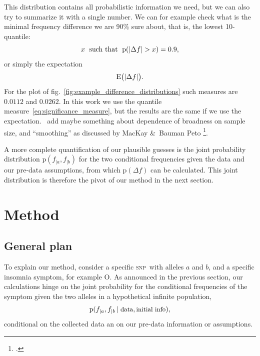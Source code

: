\documentclass[\ifafour a4paper,12pt,\else a5paper,10pt,\fi%
onecolumn,oneside,article,%
british%
]{memoir}
\theoremstyle{remark}
\theoremstyle{innote}
\newcommand*{\citey}{\footcites}
\newcommand*{\amp}{\&}
\newcommand*{\pu}{\piup}%
\DeclarePairedDelimiter\abs{\lvert}{\rvert}
\newcommand*{\pf}{\mathrm{p}}%
\newcommand*{\E}{\mathrm{E}}
\renewcommand*{\|}[1][]{\nonscript\,#1\vert\nonscript\;\mathopen{}}
\newcommand*{\sect}{\S}%
\newcommand*{\fig}{fig.}%
\newcommand*{\puzzle}{{\fontencoding{U}\fontfamily{fontawesometwo}\selectfont\symbol{225}}}
\newcommand{\mynote}[1]{ {\color{notecolour}\puzzle\ #1}}
\DeclareMathOperator{\erf}{erf}
\newcommand*{\ptext}[1]{\text{\small #1}}
\newcommand*{\snp}{\textsc{snp}}
\newcommand*{\ya}{a}
\newcommand*{\yb}{b}
\newcommand*{\ysO}{\textrm{O}}%
\newcommand*{\df}{\Delta f}
\begin{document}
This distribution contains all probabilistic information we need, but we
can also try to summarize it with a single number. We can  for example
check what is the  minimal frequency difference we are
90\% sure about, that is, the lowest 10-quantile:
\begin{equation}\label{eq:significance_measure}
x\;\text{ such that }\; \pf(\abs{\df} > x)=0.9,
\end{equation}
or simply the expectation
\begin{equation}\label{eq:significance_measure_expabs}
  \E\bigl(\abs{\df}\bigr).
\end{equation}
For the plot of \fig~\ref{fig:example_difference_distributions} such
measures are $0.0112$ and $0.0262$.
In this work we use the quantile measure~\eqref{eq:significance_measure},
but the results are the same if we use the expectation. \mynote{add maybe
  something about dependence of broadness on sample size, and
  \enquote{smoothing} as discussed by MacKay \amp\ Bauman Peto
  \citey[\sect~2.6]{mackayetal1995}.}

A more complete quantification of our plausible guesses is the joint
probability distribution $\pf(f_{|\ya}, f_{|\yb})$ for the two conditional
frequencies given the data and our pre-data assumptions, from which
$\pf(\df)$ can be calculated. This joint distribution is therefore the
pivot of our method in the next section.


\section{Method}
\label{sec:method}

\subsection{General plan}
\label{sec:inference}

To explain our method, consider a specific \snp\ with alleles $\ya$ and
$\yb$, and a specific insomnia symptom, for example $\ysO$. As announced in
the previous section, our calculations hinge on the joint probability for
the conditional frequencies of the symptom given the two alleles in a
hypothetical infinite population,
\begin{equation}
  \label{eq:goal_joint_prob}
  \pf(f_{|\ya}, f_{|\yb} \| \ptext{data}, \ptext{initial info}),
\end{equation}
conditional on the collected data an on our pre-data information or
assumptions.
\end{document}
